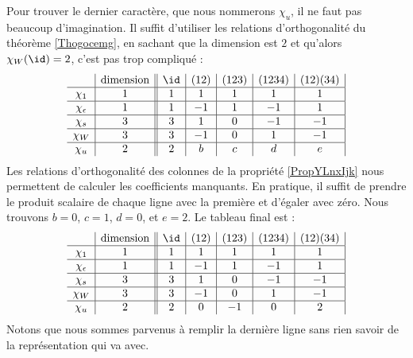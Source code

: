 Pour trouver le dernier caractère, que nous nommerons \( \chi_u\), il ne faut pas beaucoup d'imagination. Il suffit d'utiliser les relations d'orthogonalité du théorème \ref{Thogocemg}, en sachant que la dimension est \( 2\) et qu'alors \( \chi_W(\id)=2\), c'est pas trop compliqué :
\begin{equation}    \label{EqOKtZYFQ}
    \begin{array}[]{c|c||c|c|c|c|c|}
        &\text{dimension}&\id&(12)&(123)&(1234)&(12)(34)\\
          \hline
          \chi_1&1&1&1&1&1&1\\ 
          \hline
          \chi_{\epsilon}&1&1&-1&1&-1&1\\ 
          \hline
          \chi_s&3&3&1&0&-1&-1\\ 
          \hline
          \chi_W&3&3&-1&0&1&-1\\ 
          \hline
          \chi_u&2&2&b&c&d&e\\ 
    \end{array}
\end{equation}
Les relations d'orthogonalité des colonnes de la propriété \ref{PropYLnxIjk} nous permettent de calculer les coefficients manquants. En pratique, il suffit de prendre le produit scalaire de chaque ligne avec la première et d'égaler avec zéro. Nous trouvons \( b=0\), \( c=1\), \( d=0\), et \( e=2\). Le tableau final est :
\begin{equation}
    \begin{array}[]{c|c||c|c|c|c|c|}
        &\text{dimension}&\id&(12)&(123)&(1234)&(12)(34)\\
          \hline
          \chi_1&1&1&1&1&1&1\\ 
          \hline
          \chi_{\epsilon}&1&1&-1&1&-1&1\\ 
          \hline
          \chi_s&3&3&1&0&-1&-1\\ 
          \hline
          \chi_W&3&3&-1&0&1&-1\\ 
          \hline
          \chi_u&2&2&0&-1&0&2\\ 
    \end{array}
\end{equation}
Notons que nous sommes parvenus à remplir la dernière ligne sans rien savoir de la représentation qui va avec.

